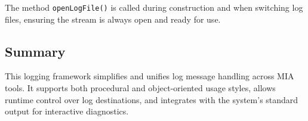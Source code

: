 The method \texttt{openLogFile()} is called during construction and when switching log files, ensuring the stream is always open and ready for use.

\subsection{Summary}
This logging framework simplifies and unifies log message handling across MIA tools. It supports both procedural and object-oriented usage styles, allows runtime control over log destinations, and integrates with the system's standard output for interactive diagnostics.





